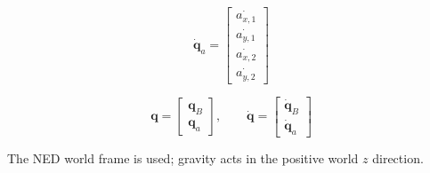 \documentclass[11pt]{article}
\begin{document}
\begin{equation}
\dot{\boldsymbol q}_a=\begin{bmatrix}\dot{a_{x,1}}\\\dot{a_{y,1}}\\\dot{a_{x,2}}\\\dot{a_{y,2}}\end{bmatrix}
\end{equation}

\begin{equation}
\boldsymbol q=\begin{bmatrix}\boldsymbol q_B\\\boldsymbol q_a\end{bmatrix},\qquad \dot{\boldsymbol q}=\begin{bmatrix}\dot{\boldsymbol q}_B\\\dot{\boldsymbol q}_a\end{bmatrix}
\end{equation}

The NED world frame is used; gravity acts in the positive world $z$ direction.
\end{document}

